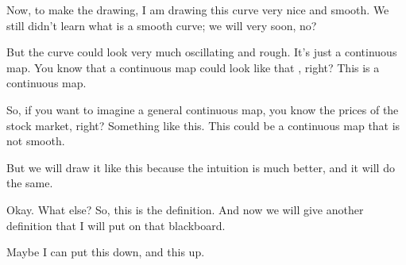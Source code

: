 \begin{content}
\begin{center}
\end{center}
\end{content}

\begin{speech}[00:34:27 - 00:35:42]
Now, to make the drawing, I am drawing this curve very nice and smooth. We still didn't learn what is a smooth curve; we will very soon, no?

But the curve could look very much oscillating and rough. It's just a continuous map. You know that a continuous map could look like that , right? This is a continuous map.

So, if you want to imagine a general continuous map, you know the prices of the stock market, right? Something like this. This could be a continuous map that is not smooth.

But we will draw it like this because the intuition is much better, and it will do the same.

Okay. What else? So, this is the definition. And now we will give another definition that I will put on that blackboard.

Maybe I can put this down, and this up.

\end{speech}

